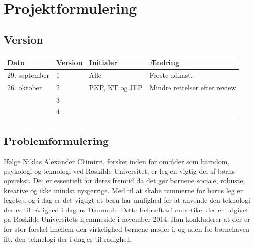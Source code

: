 \chapter{Projektformulering} \label{ch:projektformulering}
\section*{Version}
\begin{table}[h]
	\centering
	\begin{tabularx}{\textwidth - 2cm}{|l|l|l|X|}
	\hline
	Dato			& Version			& Initialer 		& Ændring										\\ \hline
	29. september 	& 1 				& Alle				& Første udkast. 								\\ \hline
	26. oktober		& 2 				& PKP, KT og JEP	& Mindre rettelser efter review						 						\\ \hline
			 		& 3 				&  					& 												\\ \hline
					& 4 				&  					& 												\\ \hline
	\end{tabularx}
\end{table}
\clearpage

\section{Problemformulering} \label{sec:problemformulering}
Ifølge Niklas Alexander Chimirri, forsker inden for områder som barndom, psykologi og teknologi ved Roskilde Universitet, er leg en vigtig del af børns opvækst.   
Det er essentielt for deres fremtid da det gør børnene sociale, robuste, kreative og ikke mindst nysgerrige. Med til at skabe rammerne for børns leg er legetøj, og i dag er det vigtigt at børn har mulighed for at anvende den teknologi der er til rådighed i dagens Danmark. 
Dette bekræftes i en artikel der er udgivet på Roskilde Universitets hjemmeside i november 2014.
Han konkluderer at der er for stor forskel imellem den virkelighed børnene møder i, og uden for børnehaven ift. den teknologi der i dag er til rådighed. 



